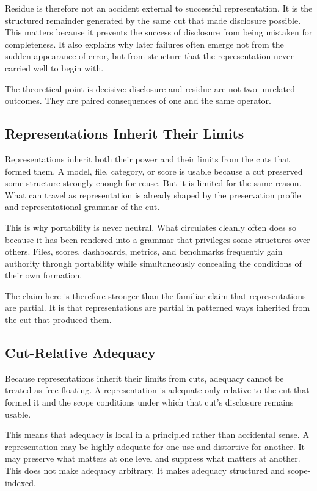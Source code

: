 \documentclass[11pt]{article}
\begin{document}
Residue is therefore not an accident external to successful representation. It is the structured remainder generated by the same cut that made disclosure possible. This matters because it prevents the success of disclosure from being mistaken for completeness. It also explains why later failures often emerge not from the sudden appearance of error, but from structure that the representation never carried well to begin with. \cite{espeland_stevens_quantification,merry_seductions_of_quantification,bowker_star_sorting_things_out}

The theoretical point is decisive: disclosure and residue are not two unrelated outcomes. They are paired consequences of one and the same operator.

\subsection{Representations Inherit Their Limits}

Representations inherit both their power and their limits from the cuts that formed them. A model, file, category, or score is usable because a cut preserved some structure strongly enough for reuse. But it is limited for the same reason. What can travel as representation is already shaped by the preservation profile and representational grammar of the cut.

This is why portability is never neutral. What circulates cleanly often does so because it has been rendered into a grammar that privileges some structures over others. Files, scores, dashboards, metrics, and benchmarks frequently gain authority through portability while simultaneously concealing the conditions of their own formation.

The claim here is therefore stronger than the familiar claim that representations are partial. It is that representations are partial in patterned ways inherited from the cut that produced them.

\subsection{Cut-Relative Adequacy}

Because representations inherit their limits from cuts, adequacy cannot be treated as free-floating. A representation is adequate only relative to the cut that formed it and the scope conditions under which that cut's disclosure remains usable.

This means that adequacy is local in a principled rather than accidental sense. A representation may be highly adequate for one use and distortive for another. It may preserve what matters at one level and suppress what matters at another. This does not make adequacy arbitrary. It makes adequacy structured and scope-indexed.
\end{document}

